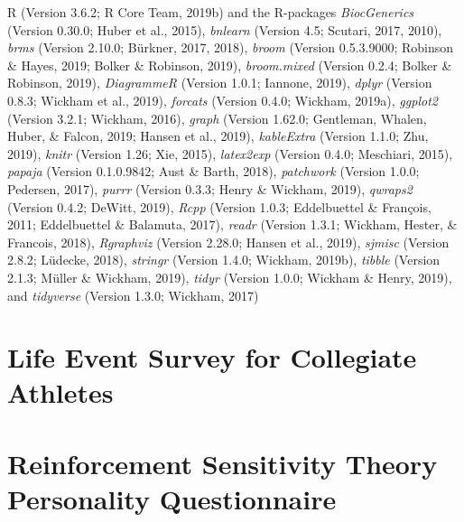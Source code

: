 \documentclass[
  english,
  man,floatsintext]{apa6}
\begin{document}
\thispagestyle{empty}\clearpage

R (Version 3.6.2; R Core Team, 2019b) and the R-packages \emph{BiocGenerics} (Version 0.30.0; Huber et al., 2015), \emph{bnlearn} (Version 4.5; Scutari, 2017, 2010), \emph{brms} (Version 2.10.0; Bürkner, 2017, 2018), \emph{broom} (Version 0.5.3.9000; Robinson \& Hayes, 2019; Bolker \& Robinson, 2019), \emph{broom.mixed} (Version 0.2.4; Bolker \& Robinson, 2019), \emph{DiagrammeR} (Version 1.0.1; Iannone, 2019), \emph{dplyr} (Version 0.8.3; Wickham et al., 2019), \emph{forcats} (Version 0.4.0; Wickham, 2019a), \emph{ggplot2} (Version 3.2.1; Wickham, 2016), \emph{graph} (Version 1.62.0; Gentleman, Whalen, Huber, \& Falcon, 2019; Hansen et al., 2019), \emph{kableExtra} (Version 1.1.0; Zhu, 2019), \emph{knitr} (Version 1.26; Xie, 2015), \emph{latex2exp} (Version 0.4.0; Meschiari, 2015), \emph{papaja} (Version 0.1.0.9842; Aust \& Barth, 2018), \emph{patchwork} (Version 1.0.0; Pedersen, 2017), \emph{purrr} (Version 0.3.3; Henry \& Wickham, 2019), \emph{qwraps2} (Version 0.4.2; DeWitt, 2019), \emph{Rcpp} (Version 1.0.3; Eddelbuettel \& François, 2011; Eddelbuettel \& Balamuta, 2017), \emph{readr} (Version 1.3.1; Wickham, Hester, \& Francois, 2018), \emph{Rgraphviz} (Version 2.28.0; Hansen et al., 2019), \emph{sjmisc} (Version 2.8.2; Lüdecke, 2018), \emph{stringr} (Version 1.4.0; Wickham, 2019b), \emph{tibble} (Version 2.1.3; Müller \& Wickham, 2019), \emph{tidyr} (Version 1.0.0; Wickham \& Henry, 2019), and \emph{tidyverse} (Version 1.3.0; Wickham, 2017)

\newpage

\appendix

\section{Life Event Survey for Collegiate Athletes}



\section{Reinforcement Sensitivity Theory Personality Questionnaire}


\end{document}

